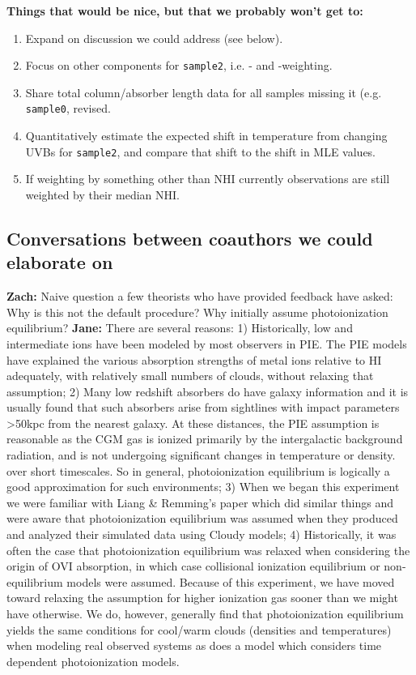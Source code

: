 \documentclass[fleqn,usenatbib]{mnras}
\begin{document}
\textbf{Things that would be nice, but that we probably won't get to:}
\begin{enumerate}
    \item Expand on discussion we could address (see below).
    \item Focus on other components for \texttt{sample2}, i.e. - and -weighting.
    \item Share total column/absorber length data for all samples missing it (e.g. \texttt{sample0}, revised.
    \item Quantitatively estimate the expected shift in temperature from changing UVBs for \texttt{sample2}, and compare that shift to the shift in MLE values.
    \item If weighting by something other than NHI currently observations are still weighted by their median NHI.
\end{enumerate}

\subsection{Conversations between coauthors we could elaborate on}

\textbf{Zach:}
Naive question a few theorists who have provided feedback have asked: Why is this not the default procedure? Why initially assume photoionization equilibrium?
\textbf{Jane:} 
There are several reasons: 1) Historically, low and intermediate ions have been modeled by most observers in PIE.
The PIE models have explained the various absorption strengths of metal ions relative to HI adequately, with relatively small numbers of clouds, without relaxing that assumption; 2) Many low redshift absorbers do have galaxy information and it is usually found that such absorbers arise from sightlines with impact parameters >50kpc from the nearest galaxy.   At these distances, the PIE assumption is reasonable as the CGM gas is ionized primarily by the intergalactic background radiation, and is not undergoing significant changes in temperature or density. over short timescales. So in general, photoionization equilibrium is logically a good approximation for such environments; 3) When we began this experiment we were familiar with Liang \& Remming's paper which did similar things and were aware that photoionization equilibrium was assumed when they produced and analyzed their simulated data using Cloudy models;  4) Historically, it was often the case that photoionization equilibrium was relaxed when considering the origin of OVI absorption, in which case collisional ionization equilibrium or non-equilibrium models were assumed.
Because of this experiment, we have moved toward relaxing the assumption for higher ionization gas sooner than we might have otherwise.  We do, however, generally find that photoionization equilibrium yields the same conditions for cool/warm clouds (densities and temperatures) when modeling real observed systems as does a model which considers time dependent photoionization models.
\end{document}
